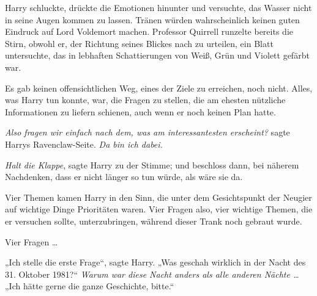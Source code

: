 Harry schluckte, drückte die Emotionen hinunter und versuchte, das Wasser nicht in seine Augen kommen zu lassen. Tränen würden wahrscheinlich keinen guten Eindruck auf Lord Voldemort machen. Professor Quirrell runzelte bereits die Stirn, obwohl er, der Richtung seines Blickes nach zu urteilen, ein Blatt untersuchte, das in lebhaften Schattierungen von Weiß, Grün und Violett gefärbt war.

Es gab keinen offensichtlichen Weg, eines der Ziele zu erreichen, noch nicht. Alles, was Harry tun konnte, war, die Fragen zu stellen, die am ehesten nützliche Informationen zu liefern schienen, auch wenn er noch keinen Plan hatte.

\emph{Also fragen wir einfach nach dem, was am interessantesten erscheint?} sagte Harrys Ravenclaw-Seite. \emph{Da bin ich dabei.}

\emph{Halt die Klappe}, sagte Harry zu der Stimme; und beschloss dann, bei näherem Nachdenken, dass er nicht länger so tun würde, als wäre sie da.

Vier Themen kamen Harry in den Sinn, die unter dem Gesichtspunkt der Neugier auf wichtige Dinge Prioritäten waren. Vier Fragen also, vier wichtige Themen, die er versuchen sollte, unterzubringen, während dieser Trank noch gebraut wurde.

Vier Fragen …

„Ich stelle die erste Frage“, sagte Harry.
„Was geschah wirklich in der Nacht des 31. Oktober 1981?“
\emph{Warum war diese Nacht anders als alle anderen Nächte …}
„Ich hätte gerne die ganze Geschichte, bitte.“

